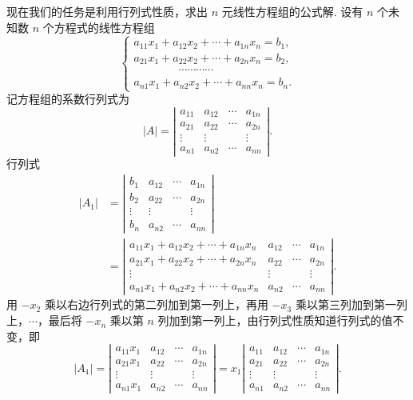 \documentclass[UTF8,12pt,a4paper,fontset=fandol]{ctexart}
\begin{document}
现在我们的任务是利用行列式性质，求出 $n$ 元线性方程组的公式解. 设有 $n$ 个未知数 $n$ 个方程式的线性方程组
\begin{equation}
\left\{
\begin{array}{l}
a_{11}x_1+a_{12}x_2+\cdots+a_{1n}x_n=b_1,\\
a_{21}x_1+a_{22}x_2+\cdots+a_{2n}x_n=b_2,\\
\hspace{4em}\cdots\cdots\cdots\cdots\\
a_{n1}x_1+a_{n2}x_2+\cdots+a_{nn}x_n=b_n.
\end{array}
\right.
\tag{1.4.8}
\end{equation}
记方程组的系数行列式为
\[
|A|=
\left|\begin{array}{cccc}
a_{11} & a_{12} & \cdots & a_{1n}\\
a_{21} & a_{22} & \cdots & a_{2n}\\
\vdots & \vdots & & \vdots\\
a_{n1} & a_{n2} & \cdots & a_{nn}
\end{array}\right|.
\]
行列式
\[
\begin{aligned}
|A_1|
&=
\left|\begin{array}{cccc}
b_1 & a_{12} & \cdots & a_{1n}\\
b_2 & a_{22} & \cdots & a_{2n}\\
\vdots & \vdots & & \vdots\\
b_n & a_{n2} & \cdots & a_{nn}
\end{array}\right|\\
&=
\left|\begin{array}{cccc}
a_{11}x_1+a_{12}x_2+\cdots+a_{1n}x_n & a_{12} & \cdots & a_{1n}\\
a_{21}x_1+a_{22}x_2+\cdots+a_{2n}x_n & a_{22} & \cdots & a_{2n}\\
\vdots & \vdots & & \vdots\\
a_{n1}x_1+a_{n2}x_2+\cdots+a_{nn}x_n & a_{n2} & \cdots & a_{nn}
\end{array}\right|.
\end{aligned}
\]
用 $-x_2$ 乘以右边行列式的第二列加到第一列上，再用 $-x_3$ 乘以第三列加到第一列上，$\cdots$，最后将 $-x_n$ 乘以第 $n$ 列加到第一列上，由行列式性质知道行列式的值不变，即
\[
|A_1|=
\left|\begin{array}{cccc}
a_{11}x_1 & a_{12} & \cdots & a_{1n}\\
a_{21}x_1 & a_{22} & \cdots & a_{2n}\\
\vdots & \vdots & & \vdots\\
a_{n1}x_1 & a_{n2} & \cdots & a_{nn}
\end{array}\right|
=x_1
\left|\begin{array}{cccc}
a_{11} & a_{12} & \cdots & a_{1n}\\
a_{21} & a_{22} & \cdots & a_{2n}\\
\vdots & \vdots & & \vdots\\
a_{n1} & a_{n2} & \cdots & a_{nn}
\end{array}\right|.
\]
\end{document}
